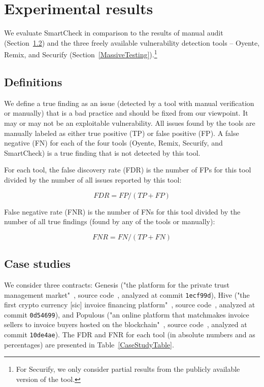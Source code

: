 \section{Experimental results} \label{SectionResults}

We evaluate SmartCheck in comparison to the results of manual audit (Section~\ref{ManualAudit}) and the three freely available vulnerability detection tools -- Oyente, Remix, and Securify (Section~\ref{MassiveTesting}).\footnote{For Securify, we only consider partial results from the publicly available version of the tool.}


\subsection{Definitions}

We define a true finding as an issue (detected by a tool with manual verification or manually) that is a bad practice and should be fixed from our viewpoint.
It may or may not be an exploitable vulnerability.
All issues found by the tools are manually labeled as either true positive (TP) or false positive (FP).
A false negative (FN) for each of the four tools (Oyente, Remix, Securify, and SmartCheck) is a true finding that is not detected by this tool.

For each tool, the false discovery rate (FDR) is the number of FPs for this tool divided by the number of all issues reported by this tool:

\[FDR = FP / (TP + FP)\]

False negative rate (FNR) is the number of FNs for this tool divided by the number of all true findings (found by any of the tools or manually):

\[FNR = FN / (TP + FN)\]


\subsection{Case studies} \label{ManualAudit}

We consider three contracts: Genesis ("the platform for the private trust management market"~\cite{Genesis}, source code~\cite{GenesisGithub}, analyzed at commit \texttt{1ecf99d}), Hive ("the first crypto currency [sic] invoice financing platform"~\cite{Hive}, source code~\cite{HiveGithub}, analyzed at commit \texttt{0d54699}), and Populous ("an online platform that matchmakes invoice sellers to invoice buyers hosted on the blockchain"~\cite{Populous}, source code~\cite{PopulousGithub}, analyzed at commit \texttt{10de4ae}).
The FDR and FNR for each tool (in absolute numbers and as percentages) are presented in Table~\ref{CaseStudyTable}.

